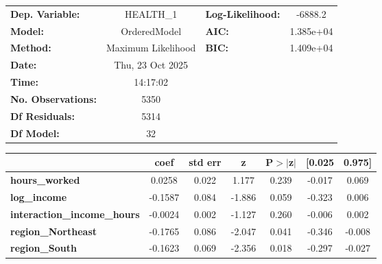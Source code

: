 \begin{center}
\begin{tabular}{lclc}
\toprule
\textbf{Dep. Variable:}                  &     HEALTH\_1      & \textbf{  Log-Likelihood:    } &   -6888.2   \\
\textbf{Model:}                          &    OrderedModel    & \textbf{  AIC:               } & 1.385e+04   \\
\textbf{Method:}                         & Maximum Likelihood & \textbf{  BIC:               } & 1.409e+04   \\
\textbf{Date:}                           &  Thu, 23 Oct 2025  & \textbf{                     } &             \\
\textbf{Time:}                           &      14:17:02      & \textbf{                     } &             \\
\textbf{No. Observations:}               &         5350       & \textbf{                     } &             \\
\textbf{Df Residuals:}                   &         5314       & \textbf{                     } &             \\
\textbf{Df Model:}                       &           32       & \textbf{                     } &             \\
\bottomrule
\end{tabular}
\begin{tabular}{lcccccc}
                                         & \textbf{coef} & \textbf{std err} & \textbf{z} & \textbf{P$> |$z$|$} & \textbf{[0.025} & \textbf{0.975]}  \\
\midrule
\textbf{hours\_worked}                   &       0.0258  &        0.022     &     1.177  &         0.239        &       -0.017    &        0.069     \\
\textbf{log\_income}                     &      -0.1587  &        0.084     &    -1.886  &         0.059        &       -0.323    &        0.006     \\
\textbf{interaction\_income\_hours}      &      -0.0024  &        0.002     &    -1.127  &         0.260        &       -0.006    &        0.002     \\
\textbf{region\_Northeast}               &      -0.1765  &        0.086     &    -2.047  &         0.041        &       -0.346    &       -0.008     \\
\textbf{region\_South}                   &      -0.1623  &        0.069     &    -2.356  &         0.018        &       -0.297    &       -0.027     \\

\end{tabular}
\end{center}
